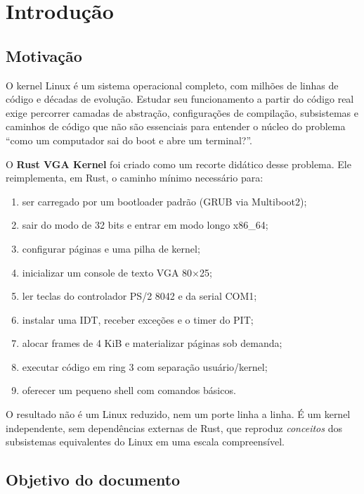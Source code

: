 \chapter{Introdu\c{c}\~ao}
\label{cap:introducao}

\section{Motiva\c{c}\~ao}

O kernel Linux \'e um sistema operacional completo, com milh\~oes de linhas de
c\'odigo e d\'ecadas de evolu\c{c}\~ao. Estudar seu funcionamento a partir do
c\'odigo real exige percorrer camadas de abstra\c{c}\~ao, configura\c{c}\~oes de
compila\c{c}\~ao, subsistemas e caminhos de c\'odigo que n\~ao s\~ao essenciais
para entender o n\'ucleo do problema ``como um computador sai do boot e abre um
terminal?''.

O \textbf{Rust VGA Kernel} foi criado como um recorte did\'atico desse
problema. Ele reimplementa, em Rust, o caminho m\'inimo necess\'ario para:

\begin{enumerate}
  \item ser carregado por um bootloader padr\~ao (GRUB via Multiboot2);
  \item sair do modo de 32 bits e entrar em modo longo x86\_64;
  \item configurar p\'aginas e uma pilha de kernel;
  \item inicializar um console de texto VGA 80$\times$25;
  \item ler teclas do controlador PS/2 8042 e da serial COM1;
  \item instalar uma IDT, receber exce\c{c}\~oes e o timer do PIT;
  \item alocar frames de 4 KiB e materializar p\'aginas sob demanda;
  \item executar c\'odigo em ring 3 com separa\c{c}\~ao usu\'ario/kernel;
  \item oferecer um pequeno shell com comandos b\'asicos.
\end{enumerate}

O resultado n\~ao \'e um Linux reduzido, nem um porte linha a linha. \'E um
kernel independente, sem depend\^encias externas de Rust, que reproduz
\emph{conceitos} dos subsistemas equivalentes do Linux em uma escala
compreens\'ivel.

\section{Objetivo do documento}

